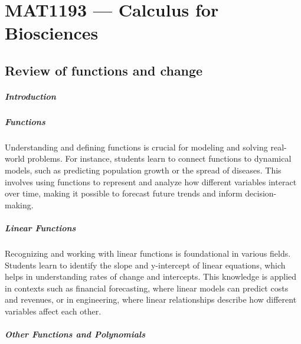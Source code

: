 \chapter{MAT1193 --- Calculus for Biosciences}
\label{chap:1193}

\ChapterWarning

\section{Review of functions and change}
\label{sec:review-of-functions-and-change}

\paragraph{Introduction}

\paragraph{Functions}

Understanding and defining functions is crucial for modeling and solving real-world problems. For instance, students learn to connect functions to dynamical models, such as predicting population growth or the spread of diseases. This involves using functions to represent and analyze how different variables interact over time, making it possible to forecast future trends and inform decision-making.


\paragraph{Linear Functions}

Recognizing and working with linear functions is foundational in various fields. Students learn to identify the slope and y-intercept of linear equations, which helps in understanding rates of change and intercepts. This knowledge is applied in contexts such as financial forecasting, where linear models can predict costs and revenues, or in engineering, where linear relationships describe how different variables affect each other.

\paragraph{Other Functions and Polynomials}

